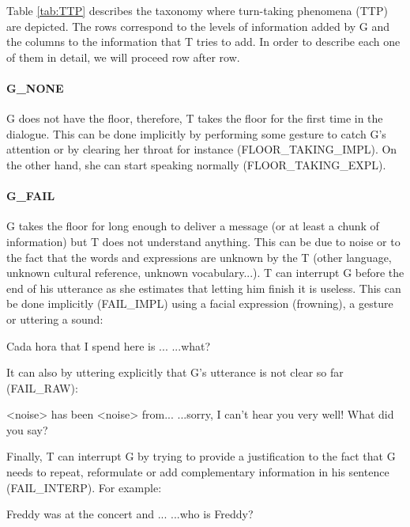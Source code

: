         Table \ref{tab:TTP} describes the taxonomy where turn-taking phenomena (TTP) are depicted. The rows correspond to the levels of information added by G and the columns to the information that T tries to add. In order to describe each one of them in detail, we will proceed row after row.
        
        \paragraph{G\_NONE} G does not have the floor, therefore, T takes the floor for the first time in the dialogue. This can be done implicitly by performing some gesture to catch G's attention or by clearing her throat for instance (FLOOR\_TAKING\_IMPL). On the other hand, she can start speaking normally (FLOOR\_TAKING\_EXPL).
        
        \paragraph{G\_FAIL} G takes the floor for long enough to deliver a message (or at least a chunk of information) but T does not understand anything. This can be due to noise or to the fact that the words and expressions are unknown by the T (other language, unknown cultural reference, unknown vocabulary...). T can interrupt G before the end of his utterance as she estimates that letting him finish it is useless. This can be done implicitly (FAIL\_IMPL) using a facial expression (frowning), a gesture or uttering a sound:
				
					\begin{dialogue}
						 Cada hora that I spend here is ...
						 ...what?
					\end{dialogue}
					
					It can also by uttering explicitly that G's utterance is not clear so far (FAIL\_RAW):
					
					\begin{dialogue}
						 <noise> has been <noise> from...
						 ...sorry, I can't hear you very well! What did you say?
					\end{dialogue}
					
					Finally, T can interrupt G by trying to provide a justification to the fact that G needs to repeat, reformulate or add complementary information in his sentence (FAIL\_INTERP). For example:
					
					\begin{dialogue}
						 Freddy was at the concert and ...
						 ...who is Freddy?
					\end{dialogue}
					
